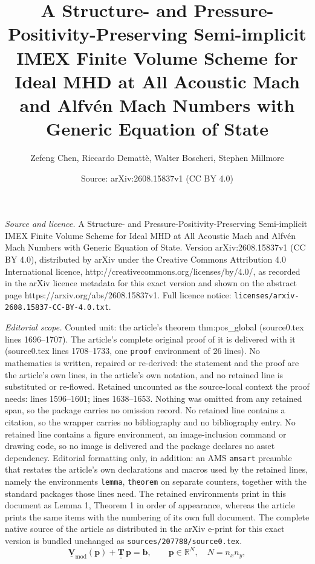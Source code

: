 \documentclass[10pt,a4paper]{amsart}
\title{A Structure- and Pressure-Positivity-Preserving Semi-implicit IMEX Finite Volume Scheme for Ideal MHD at All Acoustic Mach and Alfv\'en Mach Numbers with Generic Equation of State}
\author{Zefeng Chen, Riccardo Demattè, Walter Boscheri, Stephen Millmore}
\date{Source: arXiv:2608.15837v1 (CC BY 4.0)}
\begin{document}
\maketitle

\noindent\emph{Source and licence.} A Structure- and Pressure-Positivity-Preserving Semi-implicit IMEX Finite Volume Scheme for Ideal MHD at All Acoustic Mach and Alfv\'en Mach Numbers with Generic Equation of State. Version arXiv:2608.15837v1 (CC BY 4.0), distributed by arXiv under the Creative Commons Attribution 4.0 International licence, http://creativecommons.org/licenses/by/4.0/, as recorded in the arXiv licence metadata for this exact version and shown on the abstract page https://arxiv.org/abs/2608.15837v1. Full licence notice: \texttt{licenses/arxiv-2608.15837-CC-BY-4.0.txt}.\par\smallskip

\noindent\textit{Editorial scope.} Counted unit: the article's theorem thm:pos\_global (source0.tex lines 1696--1707). The article's complete original proof of it is delivered with it (source0.tex lines 1708--1733, one \texttt{proof} environment of 26 lines). No mathematics is written, repaired or re-derived: the statement and the proof are the article's own lines, in the article's own notation, and no retained line is substituted or re-flowed.  Retained uncounted as the source-local context the proof needs: lines 1596--1601; lines 1638--1653.  Nothing was omitted from any retained span, so the package carries no omission record.  No retained line contains a citation, so the wrapper carries no bibliography and no bibliography entry.  No retained line contains a figure environment, an image-inclusion command or drawing code, so no image is delivered and the package declares no asset dependency.  Editorial formatting only, in addition: an AMS \texttt{amsart} preamble that restates the article's own declarations and macros used by the retained lines, namely the environments \texttt{lemma}, \texttt{theorem} on separate counters, together with the standard packages those lines need.  The retained environments print in this document as Lemma 1, Theorem 1 in order of appearance, whereas the article prints the same items with the numbering of its own full document.  The complete native source of the article as distributed in the arXiv e-print for this exact version is bundled unchanged as \texttt{sources/207788/source0.tex}.
\begin{equation}
\label{eq:pos_sys}
\underline{\mathbf{V}}_{\mathrm{mod}}(\mathbf{p})
+\underline{\underline{\mathbf{T}}}\,\mathbf{p}=\mathbf{b},
\qquad \mathbf{p}\in\mathbb{R}^{N},\quad N=n_x n_y,
\end{equation}
\end{document}
